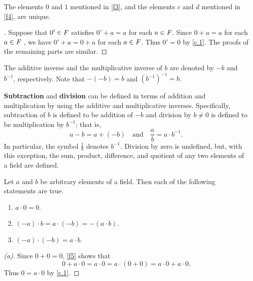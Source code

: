 \begin{cor}\label{c.0.5}
	The elements \(0\) and \(1\) mentioned in \ref{f3}, and the elements \(c\) and \(d\) mentioned in \ref{f4}, are unique.
\end{cor}

\begin{proof}[]
	Suppose that \(0' \in \mathit{F}\) satisfies \(0' + a = a\) for each \(a \in \mathit{F}\).
	Since \(0 + a = a\) for each \(a \in \mathit{F}\) , we have \(0' + a = 0 + a\) for each \(a \in \mathit{F}\).
	Thus \(0' = 0\) by \cref{c.1}.
	The proofs of the remaining parts are similar.
\end{proof}

\begin{defn}\label{c.0.6}
	The additive inverse and the multiplicative inverse of \(b\) are denoted by \(-b\) and \(b^{-1}\), respectively.
	Note that \(-(-b) = b\) and \((b^{-1})^{-1} = b\).
\end{defn}

\begin{defn}\label{c.0.7}
	\textbf{Subtraction} and \textbf{division} can be defined in terms of addition and multiplication by using the additive and multiplicative inverses.
	Specifically, subtraction of \(b\) is defined to be addition of \(-b\) and division by \(b \neq 0\) is defined to be multiplication by \(b^{-1}\);
	that is,
	\[
		a - b = a + (-b) \quad \text{and} \quad \frac{a}{b} = a \cdot b^{-1}.
	\]
	In particular, the symbol \(\frac{1}{b}\) denotes \(b^{-1}\).
	Division by zero is undefined, but, with this exception, the sum, product, difference, and quotient of any two elements of a field are defined.
\end{defn}

\begin{thm}\label{c.2}
	Let \(a\) and \(b\) be arbitrary elements of a field.
	Then each of the following statements are true.
	\begin{enumerate}
		\item \(a \cdot 0 = 0\).
		\item \((-a) \cdot b = a \cdot (-b) = -(a \cdot b)\).
		\item \((-a) \cdot (-b) = a \cdot b\).
	\end{enumerate}
\end{thm}

\begin{proof}[(a)]
	Since \(0 + 0 = 0\), \ref{f5} shows that
	\[
		0 + a \cdot 0 = a \cdot 0 = a \cdot (0 + 0) = a \cdot 0 + a \cdot 0.
	\]
	Thus \(0 = a \cdot 0\) by \cref{c.1}.
\end{proof}

